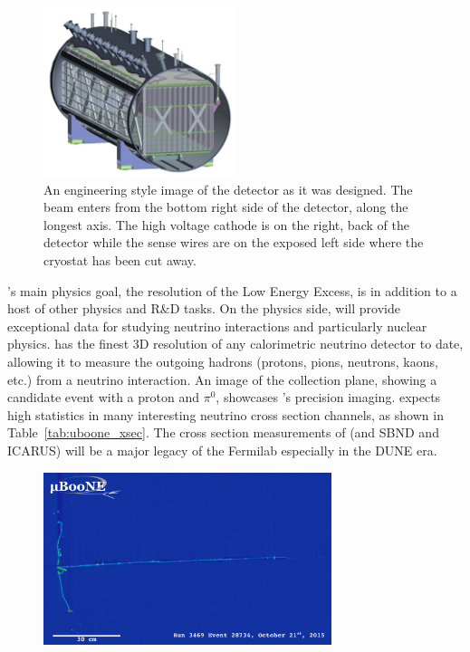 \begin{figure}[htb]
  \centering
  \includegraphics[width=0.5\textwidth]{lartpc_figures/uboone_tpc.jpg}
  \caption[\uboone Detector Design]{An engineering style image of the \uboone detector as it was designed.  The beam enters from the bottom right side of the detector, along the longest axis.  The high voltage cathode is on the right, back of the detector while the sense wires are on the exposed left side where the cryostat has been cut away.}
  \label{fig:uboone_det}
\end{figure}

\uboone's main physics goal, the resolution of the Low Energy Excess, is in addition to a host of other physics and R\&D tasks.  On the physics side, \uboone will provide exceptional data for studying neutrino interactions and particularly nuclear physics.  \uboone has the finest 3D resolution of any calorimetric neutrino detector to date, allowing it to measure the outgoing hadrons (protons, pions, neutrons, kaons, etc.) from a neutrino interaction.  An image of the \uboone collection plane, showing a \numu candidate event with a proton and $\pi^0$, showcases \uboone's precision imaging.  \uboone expects high statistics in many interesting neutrino cross section channels, as shown in Table~\ref{tab:uboone_xsec}.  The cross section measurements of \uboone (and SBND and ICARUS) will be a major legacy of the Fermilab \lartpcs especially in the DUNE\cite{DUNE} era.


\begin{figure}[htb]
  \centering
  \includegraphics[width=0.75\textwidth]{lartpc_figures/run3469_subrun574_event28734_col_small.png}
  \caption[\uboone Run 3469, Event 28734]{}
  \label{fig:uboone_r3469_e28734}
\end{figure}

